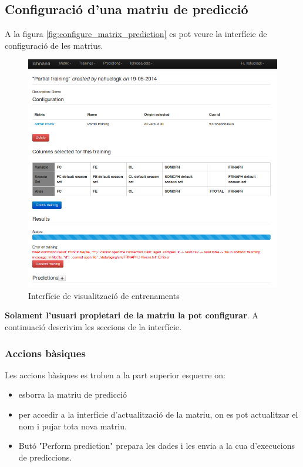 \subsection{Configuració d'una matriu de predicció}
A la figura \ref{fig:configure_matrix_prediction} es pot veure la interfície de configuració de les matrius.
\begin{figure}[h!]
  \centering
  \includegraphics[scale=0.5]{img/userguide/view_training_pending.png}
  \caption{Interfície de visualització de entrenaments}
  \label{fig:viewTraining}
\end{figure}
\textbf{Solament l'usuari propietari de la matriu la pot configurar}. A continuació descrivim les seccions de la interfície.

\subsubsection{Accions bàsiques}
Les accions bàsiques es troben a la part superior esquerre on:
\begin{itemize}
\item \iconremove esborra la matriu de predicció
\item \iconupdate per accedir a la interfície d'actualització de la matriu, on es pot actualitzar el nom i pujar tota nova matriu.
\item But\'{o} "Perform prediction" prepara les dades i les envia a la cua d'execucions de prediccions.
\end{itemize}

